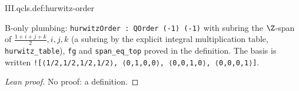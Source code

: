 \begin{definition}
\bonly
{}
\end{definition}
\begin{tfformal}{III.qcls.def:hurwitz-order}
\begin{tffidelity}
B-only plumbing: \texttt{hurwitzOrder : QOrder (-1) (-1)} with subring the $\Z$-span of $\tfrac{1+i+j+k}2,i,j,k$ (a subring by the explicit integral multiplication table, \texttt{hurwitz\_table}), \texttt{fg} and \texttt{span\_eq\_top} proved in the definition. The basis is written \texttt{![⟨1/2,1/2,1/2,1/2⟩, ⟨0,1,0,0⟩, ⟨0,0,1,0⟩, ⟨0,0,0,1⟩]}.
\end{tffidelity}
\end{tfformal}
\begin{proof}[Lean proof]
No proof: a definition.
\end{proof}

